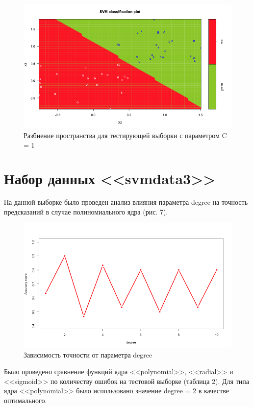 \documentclass[]{article}
\numberwithin{equation}{section}
\begin{document}
        \begin{figure}[H]
            \centering
            \includegraphics[width = 0.9\linewidth]{data/data2_test_set_1.png}
            \caption{Разбиение пространства для тестирующей выборки с параметром C = 1}
        \end{figure}

    \section{Набор данных <<svmdata3>>}
        На данной выборке было проведен анализ влияния параметра degree на точность предсказаний в случае полиномиального ядра (рис. 7).

        \vspace{-0.5cm}
        \begin{figure}[H]
            \centering
            \includegraphics[width = 0.9\linewidth]{data/data3_poly_degree.png}
            \caption{Зависимость точности от параметра degree}
        \end{figure}

        Было проведено сравнение функций ядра <<polynomial>>, <<radial>> и <<sigmoid>> по количеству ошибок на тестовой выборке (таблица 2). Для типа ядра <<polynomial>> было использовано значение degree = 2 в качестве оптимального.
\end{document}
